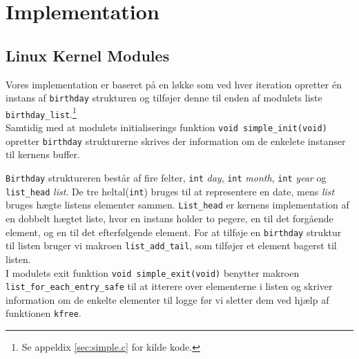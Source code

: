 \documentclass[main.tex]{subfile}
\begin{document}
\section{Implementation}
\subsection{Linux Kernel Modules}
Vores implementation er baseret på en løkke som ved hver iteration opretter én instans af \texttt{birthday} strukturen og tilføjer denne til enden af modulets liste \texttt{birthday\_list}.\footnote{Se appeldix \ref{sec:simple.c} for kilde kode.}\\

Samtidig med at modulets initialiserings funktion \texttt{void simple\_init(void)} opretter \texttt{birthday} strukturerne skrives der information om de enkelete instanser til kernens buffer. 

\texttt{Birthday} struktureren består af fire felter, \texttt{int} \emph{day}, \texttt{int} \emph{month}, \texttt{int} \emph{year} og \texttt{list\_head} \emph{list}. De tre heltal(\texttt{int}) bruges til at representere en date, mens \emph{list} bruges hægte listens elementer sammen. \texttt{List\_head} er kernens implementation af en dobbelt hægtet liste, hvor en instans holder to pegere, en til det forgående element, og en til det efterfølgende element. For at tilføje en \texttt{birthday} struktur til listen bruger vi makroen \texttt{list\_add\_tail}, som tilføjer et element bagerst til listen.\\

I modulets exit funktion \texttt{void simple\_exit(void)} benytter makroen \texttt{list\_for\_each\_entry\_safe} til at itterere over elementerne i listen og skriver information om de enkelte elementer til logge før vi sletter dem ved hjælp af funktionen \texttt{kfree}. 
\end{document}
